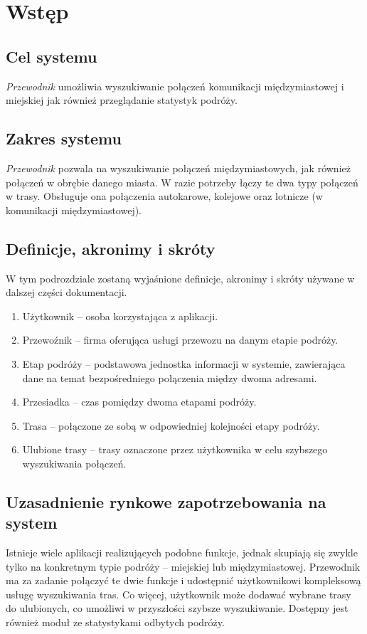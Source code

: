 \documentclass[12pt,a4paper]{report}
\begin{document}
\section{Wstęp}
\subsection{Cel systemu}
	\emph{Przewodnik} umożliwia wyszukiwanie połączeń komunikacji międzymiastowej i miejskiej jak również przeglądanie statystyk podróży.
\subsection{Zakres systemu}
	\emph{Przewodnik} pozwala na wyszukiwanie połączeń międzymiastowych, jak również połączeń w obrębie danego miasta. W razie potrzeby łączy te dwa typy połączeń w trasy. Obsługuje ona połączenia autokarowe, kolejowe oraz lotnicze (w komunikacji międzymiastowej).
\subsection{Definicje, akronimy i skróty}
	W tym podrozdziale zostaną wyjaśnione definicje, akronimy i skróty używane w dalszej części dokumentacji.
\begin{enumerate}
	\item Użytkownik -- osoba korzystająca z aplikacji.
	\item Przewoźnik -- firma oferująca usługi przewozu na danym etapie podróży.
	\item Etap podróży -- podstawowa jednostka informacji w systemie, zawierająca dane na temat bezpośredniego połączenia między dwoma adresami.
	\item Przesiadka -- czas pomiędzy dwoma etapami podróży.
	\item Trasa -- połączone ze sobą w odpowiedniej kolejności etapy podróży.
	\item Ulubione trasy -- trasy oznaczone przez użytkownika w celu szybszego wyszukiwania połączeń.
\end{enumerate}
\subsection{Uzasadnienie rynkowe zapotrzebowania na system}
	Istnieje wiele aplikacji realizujących podobne funkcje, jednak skupiają się zwykle tylko na konkretnym typie podróży -- miejskiej lub międzymiastowej. Przewodnik ma za zadanie połączyć te dwie funkcje i udostępnić użytkownikowi kompleksową usługę wyszukiwania tras. Co więcej, użytkownik może dodawać wybrane trasy do ulubionych, co umożliwi w przyszłości szybsze wyszukiwanie. Dostępny jest również moduł ze statystykami odbytych podróży.
\newpage
\end{document}

